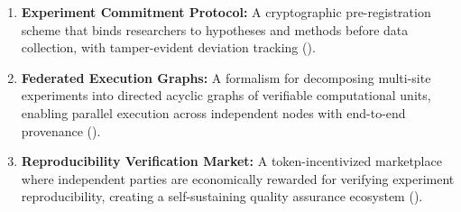 \begin{enumerate}[leftmargin=*]
    \item \textbf{Experiment Commitment Protocol:} A cryptographic pre-registration scheme that binds researchers to hypotheses and methods before data collection, with tamper-evident deviation tracking ().
    \item \textbf{Federated Execution Graphs:} A formalism for decomposing multi-site experiments into directed acyclic graphs of verifiable computational units, enabling parallel execution across independent nodes with end-to-end provenance ().
    \item \textbf{Reproducibility Verification Market:} A token-incentivized marketplace where independent parties are economically rewarded for verifying experiment reproducibility, creating a self-sustaining quality assurance ecosystem ().
\end{enumerate}

